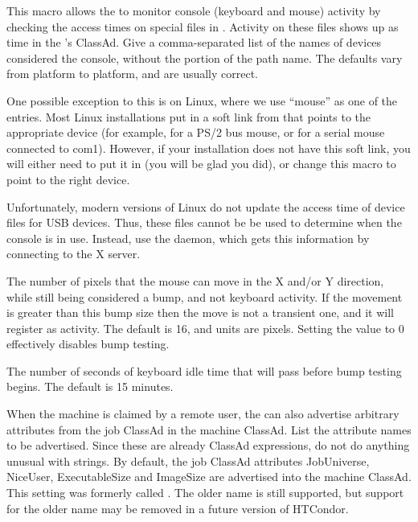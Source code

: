 \begin{description}
\label{param:ConsoleDevices}
\item[\Macro{CONSOLE\_DEVICES}]
  This macro allows the  to monitor console (keyboard and mouse)
  activity by checking the access times on special files in
  .  Activity on these files shows up as 
  time in the 's ClassAd.  Give a comma-separated list of
  the names of devices considered the console, without the
   portion of the path name.  The defaults vary from
  platform to platform, and are usually correct.  

  One possible exception to this is on Linux, where
  we use ``mouse'' as
  one of the entries.  Most Linux installations put in a
  soft link from  that points to the appropriate
  device (for example,  for a PS/2 bus mouse, or
   for a serial mouse connected to com1).  However,
  if your installation does not have this soft link, you will either
  need to put it in (you will be glad you did), or change this
  macro to point to the right device. 
  
  Unfortunately, modern versions of Linux do not update the access time of
  device files for USB devices. Thus, these files cannot be be used to
  determine when the console is in use. Instead, use the  daemon,
  which gets this information by connecting to the X server.
  
\label{param:KbddBumpCheckSize}
\item[\Macro{KBDD\_BUMP\_CHECK\_SIZE}]
  The number of pixels that the mouse can move in the X and/or Y direction,
  while still being considered a bump, and not keyboard activity. 
  If the movement is greater than this bump size then the move is 
  not a transient one, and it will register as activity. 
  The default is 16, and units are pixels. 
  Setting the value to 0 effectively disables bump testing.

\label{param:KbddBumpCheckAfterIdleTime}
\item[\Macro{KBDD\_BUMP\_CHECK\_AFTER\_IDLE\_TIME}]
  The number of seconds of keyboard idle time that will pass 
  before bump testing begins. 
  The default is 15 minutes. 

\label{param:StartdJobAttrs}
\item[\Macro{STARTD\_JOB\_ATTRS}]
  When the machine is claimed by a remote user,
  the  can also advertise
  arbitrary attributes from the job ClassAd in the machine ClassAd.
  List the attribute names to be advertised.  \Note Since
  these are already ClassAd expressions, do not do anything
  unusual with strings.
  By default, the job ClassAd attributes JobUniverse, NiceUser, ExecutableSize and ImageSize
  are advertised into the machine ClassAd.
  This setting was formerly called .
  The older name is still supported, but support for the older name may be removed in a future version of HTCondor.


\end{description}
